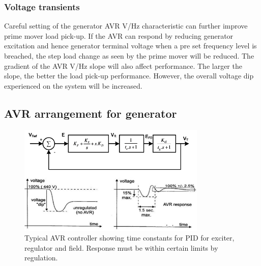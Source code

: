 \subsubsection{Voltage transients}
Careful setting of the generator AVR \si{\volt}/\si{\hertz} characteristic can further improve prime mover load pick-up. If the AVR can respond by reducing generator excitation and hence generator terminal voltage when a pre set frequency level is breached, the step load change as seen by the prime mover will be reduced. The gradient of the AVR \si{\volt}/\si{\hertz} slope will also affect performance. The larger the slope, the better the load pick-up performance. However, the overall voltage dip experienced on the system will be increased.
\subsection{AVR arrangement for generator}
\begin{figure}[H]
    \centering
    \includegraphics[width = 0.8\textwidth]{img/figure86.png}
    \caption{Typical AVR controller showing time constants for PID for exciter, regulator and field. Response must be within certain limits by regulation.}
\end{figure}

